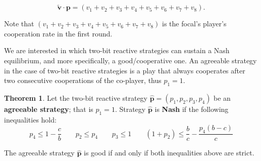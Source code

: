 \documentclass{article}
\theoremstyle{definition}
\newtheorem{theorem}{Theorem}[section]
\begin{document}
\begin{equation}
  \mathbf{\tilde{v}}  \cdot \mathbf{p} = (v_1 + v_2 + v_3 + v_4 + v_5 + v_6 + v_7 + v_8).
\end{equation}

Note that \((v_1 + v_2 + v_3 + v_4 + v_5 + v_6 + v_7 + v_8)\) is the focal's
player's cooperation rate in the first round.

We are interested in which two-bit reactive strategies can sustain a Nash
equilibrium, and more specifically, a good/cooperative one. An agreeable strategy in
the case of two-bit reactive strategies is a play that always cooperates after
two consecutive cooperations of the co-player, thus \(p_1 = 1\).

\begin{theorem}

  Let the two-bit reactive strategy \(\mathbf{\hat{p}} = (p_{1}, p_{2}, p_{3}, p_{4})\) be an \textbf{agreeable
  strategy}; that is \(p_1 = 1\). Strategy \(\mathbf{\hat{p}}\) is \textbf{Nash} if the
  following inequalities hold:
  \begin{equation*}
      p_4 \leq 1 - \frac{c}{b} \qquad  p_2  \leq p_4 \qquad p_3 \leq 1 \qquad (1 + p_2) \leq \frac{b}{c} - \frac{p_4 (b - c)}{c}
  \end{equation*}
  
  The agreeable strategy \(\mathbf{\hat{p}}\) is good if and only if both inequalities above are strict.
  \end{theorem}
  
\end{document}
